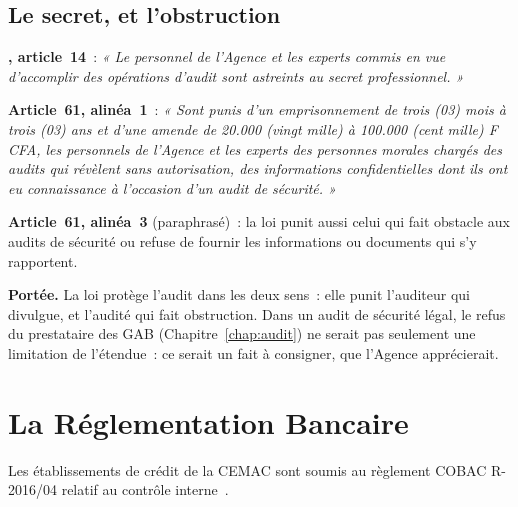 \subsection{Le secret, et l'obstruction}

\begin{boxjuris}
\textbf{, article~14}~: \textit{« Le personnel de
l'Agence et les experts commis en vue d'accomplir des opérations d'audit
sont astreints au secret professionnel. »}

\medskip
\textbf{Article~61, alinéa~1}~: \textit{« Sont punis d'un emprisonnement de
trois (03) mois à trois (03) ans et d'une amende de 20.000 (vingt mille) à
100.000 (cent mille) F CFA, les personnels de l'Agence et les experts des
personnes morales chargés des audits qui révèlent sans autorisation, des
informations confidentielles dont ils ont eu connaissance à l'occasion
d'un audit de sécurité. »}

\medskip
\textbf{Article~61, alinéa~3} (paraphrasé)~: la loi punit aussi celui qui
fait obstacle aux audits de sécurité ou refuse de fournir les informations
ou documents qui s'y rapportent.

\medskip
\textbf{Portée.} La loi protège l'audit dans les deux sens~: elle punit
l'auditeur qui divulgue, et l'audité qui fait obstruction. Dans un audit de
sécurité légal, le refus du prestataire des GAB (Chapitre~\ref{chap:audit})
ne serait pas seulement une limitation de l'étendue~: ce serait un fait à
consigner, que l'Agence apprécierait.
\end{boxjuris}

\section{La Réglementation Bancaire}
\label{sec:c10-cobac}

Les établissements de crédit de la CEMAC sont soumis au règlement COBAC
R-2016/04 relatif au contrôle interne~\cite{cobac2016r04}.

